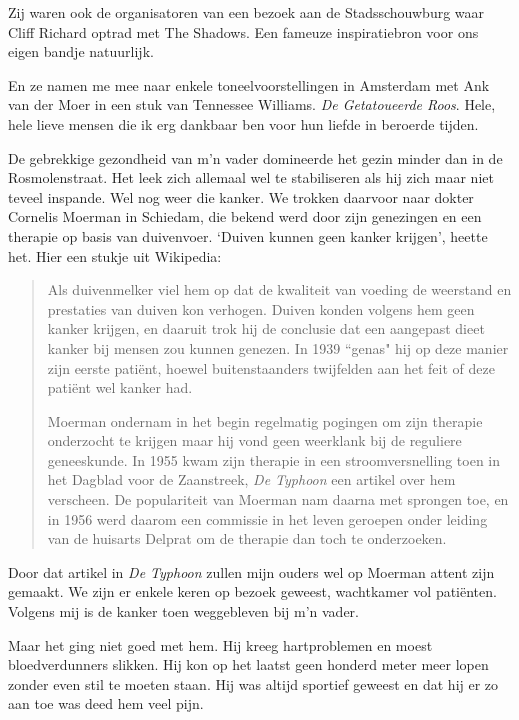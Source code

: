 \documentclass[10pt,twoside, openright]{memoir}
\begin{document}
Zij waren ook de organisatoren van een bezoek aan de Stadsschouwburg waar Cliff Richard optrad met The Shadows. Een fameuze inspiratiebron voor ons eigen bandje natuurlijk. 

En ze namen me mee naar enkele toneelvoorstellingen in Amsterdam met Ank van der Moer in een stuk van Tennessee Williams. \emph{De Getatoueerde Roos}. Hele, hele lieve mensen die ik erg dankbaar ben voor hun liefde in beroerde tijden. 

De gebrekkige gezondheid van m’n vader domineerde het gezin minder dan in de Rosmolenstraat. Het leek zich allemaal wel te stabiliseren als hij zich maar niet teveel inspande. Wel nog weer die kanker. We trokken daarvoor naar dokter Cornelis Moerman in Schiedam, die bekend werd door zijn genezingen en een therapie op basis van duivenvoer. `Duiven kunnen geen kanker krijgen', heette het. Hier een stukje uit Wikipedia:

\begin{quote}
Als duivenmelker viel hem op dat de kwaliteit van voeding de weerstand en prestaties van duiven kon verhogen. Duiven konden volgens hem geen kanker krijgen, en daaruit trok hij de conclusie dat een aangepast dieet kanker bij mensen zou kunnen genezen. In 1939 ``genas" hij op deze manier zijn eerste patiënt, hoewel buitenstaanders twijfelden aan het feit of deze patiënt wel kanker had. 

Moerman ondernam in het begin regelmatig pogingen om zijn therapie onderzocht te krijgen maar hij vond geen weerklank bij de reguliere geneeskunde. In 1955 kwam zijn therapie in een stroomversnelling toen in het Dagblad voor de Zaanstreek, \emph{De Typhoon} een artikel over hem verscheen. De populariteit van Moerman nam daarna met sprongen toe, en in 1956 werd daarom een commissie in het leven geroepen onder leiding van de huisarts Delprat om de therapie dan toch te onderzoeken.
\end{quote}

Door dat artikel in \emph{De Typhoon} zullen mijn ouders wel op Moerman attent zijn gemaakt. We zijn er enkele keren op bezoek geweest, wachtkamer vol patiënten. Volgens mij is de kanker toen weggebleven bij m’n vader. 

Maar het ging niet goed met hem. Hij kreeg hartproblemen en moest bloedverdunners slikken. Hij kon op het laatst geen honderd meter meer lopen zonder even stil te moeten staan. Hij was altijd sportief geweest en dat hij er zo aan toe was deed hem veel pijn.
\end{document}

